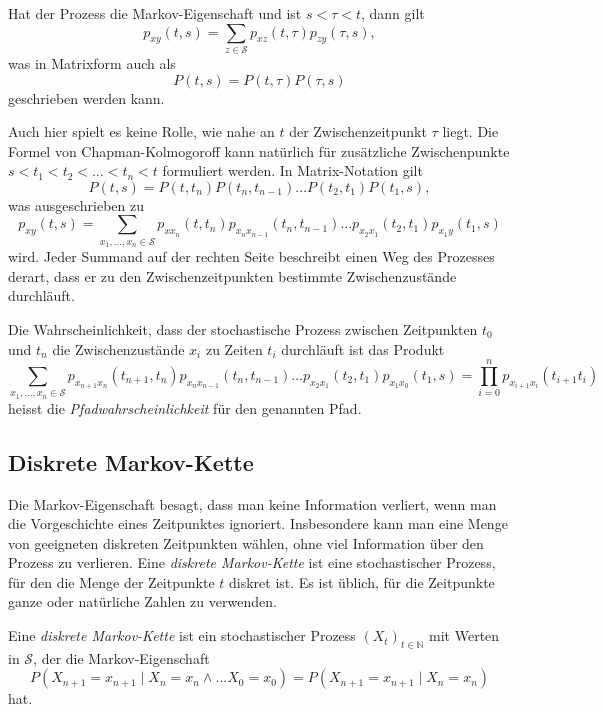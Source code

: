 \begin{satz}
Hat der Prozess die Markov-Eigenschaft und ist $s<\tau <t$, dann gilt
\[
p_{xy}(t,s) = \sum_{z\in\mathcal{S}} p_{xz}(t,\tau) p_{zy}(\tau,s),
\]
was in Matrixform auch als
\[
P(t,s) = P(t,\tau)P(\tau,s)
\]
geschrieben werden kann.
\end{satz}

Auch hier spielt es keine Rolle, wie nahe an $t$ der Zwischenzeitpunkt
$\tau$ liegt.
Die Formel von Chapman-Kolmogoroff kann natürlich für zusätzliche
Zwischenpunkte $s<t_1<t_2<\dots< t_n< t$ formuliert werden.
In Matrix-Notation gilt
\[
P(t,s) = P(t,t_n)P(t_n,t_{n-1})\dots P(t_2,t_1)P(t_1,s),
\]
was ausgeschrieben zu
\[
p_{xy}(t,s)
=
\sum_{x_1,\dots,x_n\in\mathcal{S}}
p_{xx_n}(t,t_n)
p_{x_nx_{n-1}}(t_n,t_{n-1})
\dots
p_{x_2x_1}(t_2,t_1)
p_{x_1y}(t_1,s)
\]
wird.
Jeder Summand auf der rechten Seite beschreibt einen Weg des Prozesses
derart, dass er zu den Zwischenzeitpunkten bestimmte 
Zwischenzustände durchläuft.

\begin{definition}
Die Wahrscheinlichkeit, dass der stochastische Prozess zwischen Zeitpunkten
$t_0$ und $t_n$ die Zwischenzustände $x_i$ zu Zeiten $t_i$ durchläuft ist
das Produkt
\[
\sum_{x_1,\dots,x_n\in\mathcal{S}}
p_{x_{n+1}x_n}(t_{n+1},t_n)
p_{x_nx_{n-1}}(t_n,t_{n-1})
\dots
p_{x_2x_1}(t_2,t_1)
p_{x_1x_0}(t_1,s)
=
\prod_{i=0}^{n}
p_{x_{i+1}x_i}(t_{i+1}t_i)
\]
heisst die {\em Pfadwahrscheinlichkeit} für den genannten Pfad.
%
\end{definition}

%
%
\subsection{Diskrete Markov-Kette}
Die Markov-Eigenschaft besagt, dass man keine Information verliert,
wenn man die Vorgeschichte eines Zeitpunktes ignoriert.
Insbesondere kann man eine Menge von geeigneten diskreten
Zeitpunkten wählen, ohne viel Information über den Prozess zu
verlieren.
Eine {\em diskrete Markov-Kette} ist eine stochastischer Prozess,
für den die Menge der Zeitpunkte $t$ diskret ist.
Es ist üblich, für die Zeitpunkte ganze oder natürliche Zahlen zu
verwenden.

\begin{definition}
Eine {\em diskrete Markov-Kette} ist ein stochastischer Prozess
$(X_t)_{t\in\mathbb{N}}$ mit Werten in $\mathcal{S}$, der die
Markov-Eigenschaft
\[
P(X_{n+1}=x_{n+1}\mid X_n=x_n\wedge\dots X_0=x_0)
=
P(X_{n+1}=x_{n+1}\mid X_n=x_n)
\]
hat.
\end{definition}
%
%

